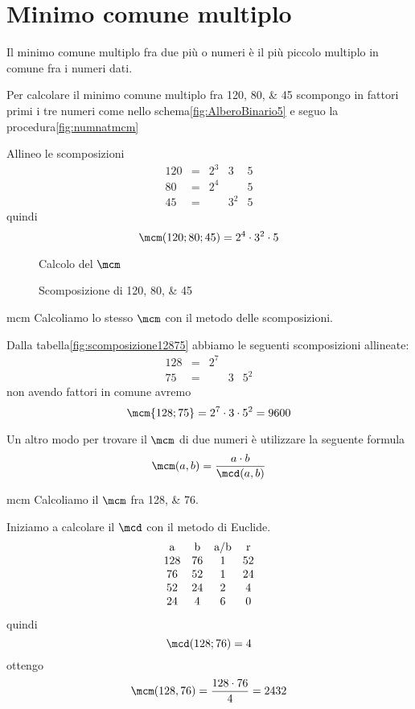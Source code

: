 \section{Minimo comune multiplo}
        	\label{sec:mcmnumerinaturali}
     Il minimo comune multiplo fra due più o numeri è il più piccolo multiplo  in comune fra i numeri dati. 
    
    Per calcolare il minimo comune multiplo fra \numlist{120;80;45}  scompongo in fattori  primi i tre numeri come nello schema\vref{fig:AlberoBinario5}   e seguo la procedura\nobs\vref{fig:numnatmcm}     	
    	
   Allineo le scomposizioni
    \[
       \begin{array}{rclll}
       120&= & 2^3 & 3& 5 \\
       80&= & 2^4 & & 5 \\
       45&= &  & 3^2& 5
       \end{array}
       \]
    quindi \[ \mcm(120;80;45)=2^4\cdot 3^2\cdot 5\]
    	    \begin{figure}
    	    	\centering
    	    
    	    	\caption{Calcolo del $\mcm$}
    	    \label{fig:numnatmcm}
    	    \end{figure}
    \begin{figure}
    	\centering
    
    	\caption[]{Scomposizione di \numlist{120;80;45}}  
    	\label{fig:AlberoBinario5}
    \end{figure}
  \begin{esempiot}{mcm}{}
   Calcoliamo lo stesso $\mcm$ con il metodo delle scomposizioni. 
   \end{esempiot}
     	    Dalla tabella\nobs\vref{fig:scomposizione12875} abbiamo le seguenti scomposizioni allineate:
     	     \[
     	       \begin{array}{rclll}
     	       128& = & 2^7&   &    \\
     	       75 & = &    & 3 & 5^2 
     	       \end{array}
     	       \]
     	            	       non avendo fattori in comune avremo
     	        \[\mcm{128;75}=2^7\cdot 3\cdot 5^2=9600\] 

  Un altro modo per trovare il $\mcm$ di due numeri è utilizzare la seguente formula\[ \mcm(a,b )=\dfrac{a\cdot b}{\mcd(a,b)}\]
  \begin{esempiot}{mcm}{}
  Calcoliamo il $\mcm$ fra \numlist{128;76}. 
    \end{esempiot}
  Iniziamo a calcolare il $\mcd$ con il metodo di Euclide.
   \[
     	   \begin{array}{cccc}
     	   $a$&$b$&$a/b$&$r$\\
     	   	128 & 76 & 1 & 52\\
     	   	76 & 52 & 1 & 24\\
     	   	52 & 24 & 2 & 4\\
     	   	24 & 4 & 6 & 0
     	    \end{array} 
     	     \]
     	quindi \[\mcd(128;76)=4\]
     	ottengo
     	\[ \mcm(128,76 )=\dfrac{128\cdot 76}{4}=2432\]

